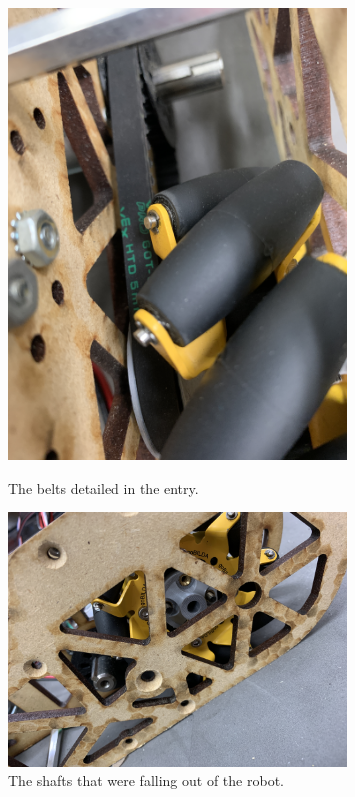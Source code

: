 \begin{figure}[ht]
\centering
\begin{minipage}[b]{.50\textwidth}
  \centering
  \includegraphics[width=0.8\textwidth]{Meetings/September/09-16-21/9-16-21_Hardware_Image1 - Nathan Forrer.JPG}
  \caption{The belts detailed in the entry.}
  \label{fig:pic1}
\end{minipage}%
\hfill%
\begin{minipage}[b]{.50\textwidth}
  \centering
  \includegraphics[width=0.8\textwidth]{Meetings/September/09-16-21/9-16-21_Hardware_Image2 - Nathan Forrer.JPG}
  \caption{The shafts that were falling out of the robot.}
  \label{fig:pic2}
\end{minipage}
\end{figure}


